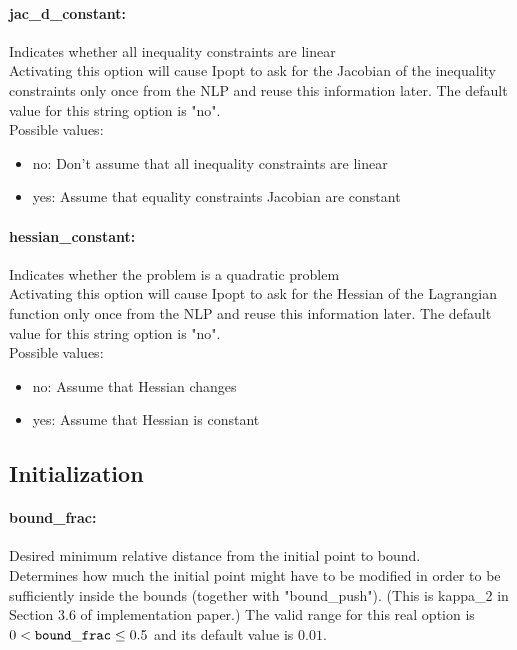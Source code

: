 \paragraph{jac\_d\_constant:}\label{opt:jac_d_constant} Indicates whether all inequality constraints are linear \\
 Activating this option will cause Ipopt to ask for the Jacobian of the inequality constraints only once from the NLP and reuse this information later. The default value for this string option is "no".
\\ 
Possible values:
\begin{itemize}
   \item no: Don't assume that all inequality constraints are linear
   \item yes: Assume that equality constraints Jacobian are constant
\end{itemize}

\paragraph{hessian\_constant:}\label{opt:hessian_constant} Indicates whether the problem is a quadratic problem \\
 Activating this option will cause Ipopt to ask for the Hessian of the Lagrangian function only once from the NLP and reuse this information later. The default value for this string option is "no".
\\ 
Possible values:
\begin{itemize}
   \item no: Assume that Hessian changes
   \item yes: Assume that Hessian is constant
\end{itemize}

\subsection{Initialization}

\paragraph{bound\_frac:}\label{opt:bound_frac} Desired minimum relative distance from the initial point to bound. \\
 Determines how much the initial point might have to be modified in order to be sufficiently inside the bounds (together with "bound\_push").  (This is kappa\_2 in Section 3.6 of implementation paper.) The valid range for this real option is 
$0 <  {\tt bound\_frac } \le 0.5$
and its default value is $0.01$.


